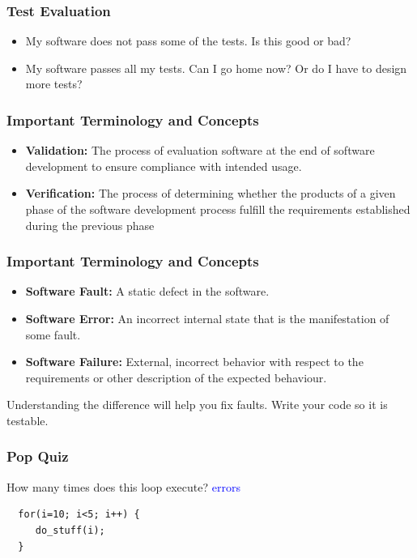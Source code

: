 \documentclass{beamer}
\newcommand{\recordingpause}{
\begin{frame}{Recording Pause}
  \begin{center}
    Recording Pause
  \end{center}
\end{frame}
}
\renewcommand{\recordingpause}{}
\begin{document}
\begin{frame}
  \frametitle{Test Evaluation}
  \begin{itemize}
  \item My software does not pass some of the tests. Is this good or
    bad?
  \item My software passes all my tests. Can I go home now? Or do I
    have to design more tests?
  \end{itemize}
\end{frame}

\recordingpause

\begin{frame}
  \frametitle{Important Terminology and Concepts}

  \begin{itemize}
  \item {\bf Validation:} The process of evaluation software at the end
    of software development to ensure compliance with intended usage.
  \item {\bf Verification:} The process of determining whether the
    products of a given phase of the software development process
    fulfill the requirements established during the previous phase
  \end{itemize}
  
\end{frame}
\begin{frame}
  \frametitle{Important Terminology and Concepts}
  \begin{itemize}
  \item  {\bf Software Fault:} A static defect in the software.
  \item {\bf Software Error:} An incorrect internal state that is the
    manifestation of some fault. 
  \item {\bf  Software Failure:} External,
    incorrect behavior with respect to the requirements or other
    description of the expected behaviour.
  \end{itemize}
Understanding the difference will help you fix faults. Write your code
so it is testable.
\end{frame}
\begin{frame}[fragile]
  \frametitle{Pop Quiz}
  How many times does this loop execute?
 \textcolor{blue}{errors}\begin{lstlisting}
  for(i=10; i<5; i++) {
     do_stuff(i);
  }
\end{lstlisting}

\end{frame}
\end{document}
